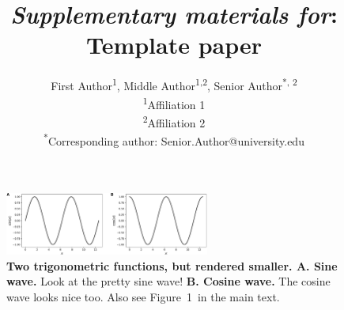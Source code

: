 \documentclass{article}
\title{\textit{Supplementary materials for}: Template paper}
\author{First Author\textsuperscript{1}, Middle Author\textsuperscript{1,2}, Senior Author\textsuperscript{*, 2}\\\textsuperscript{1}Affiliation 1\\\textsuperscript{2}Affiliation 2\\\textsuperscript{*}Corresponding author: Senior.Author@university.edu}
\newcommand{\demo}{1}
\begin{document}
\renewcommand{\figurename}{Supplementary Figure}


\setcounter{equation}{0}
\setcounter{figure}{0}
\setcounter{table}{0}
\setcounter{page}{1}
\setcounter{section}{0}
\makeatletter
\renewcommand{\theequation}{S\arabic{equation}}
\renewcommand{\thefigure}{S\arabic{figure}}
\renewcommand{\bibnumfmt}[1]{[S#1]}
\renewcommand{\citenumfont}[1]{S#1}

\newcommand{\demo}{1}

\maketitle

\begin{figure}[tp]
\centering
\includegraphics[width=0.6\textwidth]{figs/trig}
\caption{\textbf{Two trigonometric functions, but rendered smaller.  A. Sine wave.} Look at the pretty sine wave!  \textbf{B. Cosine wave.}  The cosine wave looks nice too.  Also see Figure~\demo~in the main text.}
\label{fig:demo}
\end{figure}

\newpage
\renewcommand{\refname}{Supplementary references}


\end{document}

